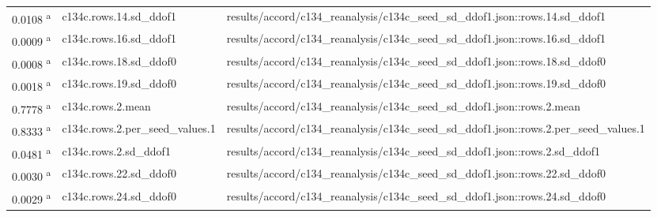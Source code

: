 \begin{longtable}{@{}p{0.7in}p{1.9in}p{2.6in}@{}}
0.0108 \textsuperscript{a} & c134c.\allowbreak{}rows.\allowbreak{}14.\allowbreak{}sd\_ddof1 & results/\allowbreak{}accord/\allowbreak{}c134\_reanalysis/\allowbreak{}c134c\_seed\_sd\_ddof1.\allowbreak{}json::rows.\allowbreak{}14.\allowbreak{}sd\_ddof1\\
0.0009 \textsuperscript{a} & c134c.\allowbreak{}rows.\allowbreak{}16.\allowbreak{}sd\_ddof1 & results/\allowbreak{}accord/\allowbreak{}c134\_reanalysis/\allowbreak{}c134c\_seed\_sd\_ddof1.\allowbreak{}json::rows.\allowbreak{}16.\allowbreak{}sd\_ddof1\\
0.0008 \textsuperscript{a} & c134c.\allowbreak{}rows.\allowbreak{}18.\allowbreak{}sd\_ddof0 & results/\allowbreak{}accord/\allowbreak{}c134\_reanalysis/\allowbreak{}c134c\_seed\_sd\_ddof1.\allowbreak{}json::rows.\allowbreak{}18.\allowbreak{}sd\_ddof0\\
0.0018 \textsuperscript{a} & c134c.\allowbreak{}rows.\allowbreak{}19.\allowbreak{}sd\_ddof0 & results/\allowbreak{}accord/\allowbreak{}c134\_reanalysis/\allowbreak{}c134c\_seed\_sd\_ddof1.\allowbreak{}json::rows.\allowbreak{}19.\allowbreak{}sd\_ddof0\\
0.7778 \textsuperscript{a} & c134c.\allowbreak{}rows.\allowbreak{}2.\allowbreak{}mean & results/\allowbreak{}accord/\allowbreak{}c134\_reanalysis/\allowbreak{}c134c\_seed\_sd\_ddof1.\allowbreak{}json::rows.\allowbreak{}2.\allowbreak{}mean\\
0.8333 \textsuperscript{a} & c134c.\allowbreak{}rows.\allowbreak{}2.\allowbreak{}per\_seed\_values.\allowbreak{}1 & results/\allowbreak{}accord/\allowbreak{}c134\_reanalysis/\allowbreak{}c134c\_seed\_sd\_ddof1.\allowbreak{}json::rows.\allowbreak{}2.\allowbreak{}per\_seed\_values.\allowbreak{}1\\
0.0481 \textsuperscript{a} & c134c.\allowbreak{}rows.\allowbreak{}2.\allowbreak{}sd\_ddof1 & results/\allowbreak{}accord/\allowbreak{}c134\_reanalysis/\allowbreak{}c134c\_seed\_sd\_ddof1.\allowbreak{}json::rows.\allowbreak{}2.\allowbreak{}sd\_ddof1\\
0.0030 \textsuperscript{a} & c134c.\allowbreak{}rows.\allowbreak{}22.\allowbreak{}sd\_ddof0 & results/\allowbreak{}accord/\allowbreak{}c134\_reanalysis/\allowbreak{}c134c\_seed\_sd\_ddof1.\allowbreak{}json::rows.\allowbreak{}22.\allowbreak{}sd\_ddof0\\
0.0029 \textsuperscript{a} & c134c.\allowbreak{}rows.\allowbreak{}24.\allowbreak{}sd\_ddof0 & results/\allowbreak{}accord/\allowbreak{}c134\_reanalysis/\allowbreak{}c134c\_seed\_sd\_ddof1.\allowbreak{}json::rows.\allowbreak{}24.\allowbreak{}sd\_ddof0\\

\end{longtable}
